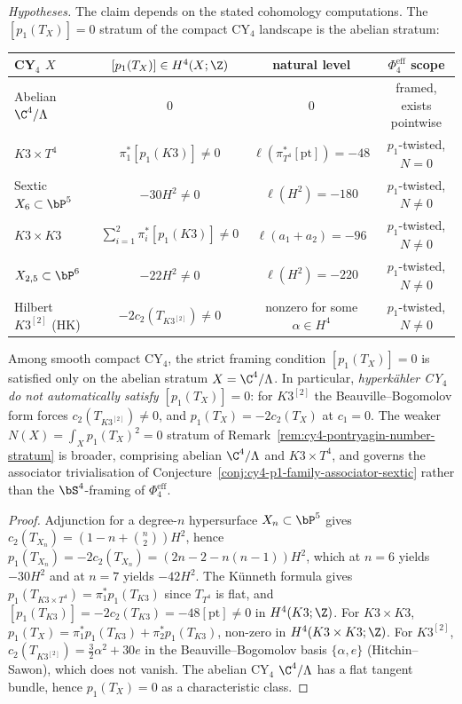 \begin{corollary}
\label{cor:phi-4-p1-vanishing-stratum}
\noindent\emph{Hypotheses.} The claim depends on the stated cohomology computations.
The $[p_1(T_X)] = 0$ stratum of the compact CY${}_4$ landscape is the
abelian stratum:
\begin{center}
\renewcommand{\arraystretch}{1.3}
\begin{tabular}{lccc}
\toprule
CY${}_4$ $X$ & $[p_1(T_X)] \in H^4(X;\Z)$ & natural level & $\Phi_4^{\mathrm{eff}}$ scope \\
\midrule
Abelian $\C^4/\Lambda$ & $0$ & $0$ & framed, exists pointwise \\
$K3 \times T^4$ & $\pi_1^*[p_1(K3)] \neq 0$ & $\ell(\pi_{T^4}^*[\mathrm{pt}])=-48$ & $p_1$-twisted, $N = 0$ \\
Sextic $X_6 \subset \bP^5$ & $-30 H^2 \neq 0$ & $\ell(H^2)=-180$ & $p_1$-twisted, $N \neq 0$ \\
$K3 \times K3$ & $\sum_{i=1}^{2}\pi_i^*[p_1(K3)] \neq 0$ & $\ell(a_1+a_2)=-96$ & $p_1$-twisted, $N \neq 0$ \\
\(X_{2,5}\subset\bP^6\) & \(-22H^2\neq0\) & \(\ell(H^2)=-220\) & \(p_1\)-twisted, \(N\neq0\) \\
Hilbert $K3^{[2]}$ \textup{(}HK\textup{)} & $-2 c_2(T_{K3^{[2]}}) \neq 0$ & nonzero for some $\alpha\in H^4$ & $p_1$-twisted, $N \neq 0$ \\
\bottomrule
\end{tabular}
\end{center}
Among smooth compact CY${}_4$, the strict framing condition $[p_1(T_X)] = 0$
is satisfied only on the abelian stratum $X = \C^4/\Lambda$. In particular,
\emph{hyperk\"ahler CY${}_4$ do not automatically satisfy
$[p_1(T_X)] = 0$}: for $K3^{[2]}$ the Beauville--Bogomolov form forces
$c_2(T_{K3^{[2]}}) \neq 0$, and $p_1(T_X) = -2 c_2(T_X)$ at $c_1 = 0$.
The weaker $N(X) = \int_X p_1(T_X)^2 = 0$ stratum of
Remark~\ref{rem:cy4-pontryagin-number-stratum} is broader, comprising
abelian $\C^4/\Lambda$ and $K3 \times T^4$, and governs the associator
trivialisation of
Conjecture~\ref{conj:cy4-p1-family-associator-sextic}
rather than the $\bS^4$-framing of $\Phi_4^{\mathrm{eff}}$.
\end{corollary}

\begin{proof}
Adjunction for a degree-$n$ hypersurface $X_n \subset \bP^5$ gives
$c_2(T_{X_n}) = (1 - n + \binom{n}{2})H^2$, hence
$p_1(T_{X_n}) = -2 c_2(T_{X_n}) = (2n - 2 - n(n-1))H^2$, which at $n = 6$
yields $-30 H^2$ and at $n = 7$ yields $-42 H^2$. The K\"unneth formula gives
$p_1(T_{K3 \times T^4}) = \pi_1^*p_1(T_{K3})$ since $T_{T^4}$ is flat, and
$[p_1(T_{K3})] = -2 c_2(T_{K3}) = -48[\mathrm{pt}] \neq 0$ in $H^4(K3; \Z)$.
For $K3 \times K3$, $p_1(T_X) = \pi_1^*p_1(T_{K3}) + \pi_2^*p_1(T_{K3})$,
non-zero in $H^4(K3 \times K3; \Z)$. For $K3^{[2]}$,
$c_2(T_{K3^{[2]}}) = \tfrac{3}{2}\alpha^2 + 30 e$ in the
Beauville--Bogomolov basis $\{\alpha, e\}$ \textup{(}Hitchin--Sawon\textup{)},
which does not vanish. The abelian CY${}_4$ $\C^4/\Lambda$ has a flat
tangent bundle, hence $p_1(T_X) = 0$ as a characteristic class.
\end{proof}


